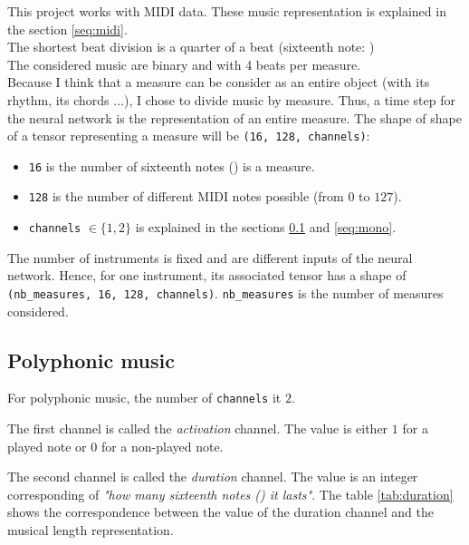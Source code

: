 \documentclass[12pt]{report}
\begin{document}
This project works with MIDI data. These music representation is explained in the section \ref{seq:midi}. \\
The shortest beat division is a quarter of a beat (sixteenth note: \musSixteenth) \\
The considered music are binary and with 4 beats per measure. \\
Because I think that a measure can be consider as an entire object (with its rhythm, its chords ...), I chose to divide music by measure. Thus, a time step for the neural network is the representation of an entire measure.
The shape of shape of a tensor representing a measure will be \texttt{(16, 128, channels)}:
\begin{itemize}
    \item \texttt{16} is the number of sixteenth notes (\musSixteenth) is a measure.
    \item \texttt{128} is the number of different MIDI notes possible (from $0$ to $127$).
    \item \texttt{channels} $\in \{1, 2\}$ is explained in the sections \ref{seq:poly} and \ref{seq:mono}.
\end{itemize}

The number of instruments is fixed and are different inputs of the neural network.
Hence, for one instrument, its associated tensor has a shape of \texttt{(nb\_measures, 16, 128, channels)}. \texttt{nb\_measures} is the number of measures considered.

\subsection{Polyphonic music}
\label{seq:poly}

For polyphonic music, the number of \texttt{channels} it $2$.

The first channel is called the \textit{activation} channel. The value is either $1$ for a played note or $0$ for a non-played note.

The second channel is called the \textit{duration} channel. The value is an integer corresponding of \textit{"how many sixteenth notes (\musSixteenth) it lasts"}.
The table \ref{tab:duration} shows the correspondence between the value of the duration channel and the musical length representation.
\end{document}
